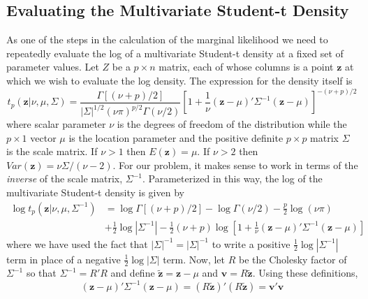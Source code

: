 \documentclass[12pt]{article}
\begin{document}
\subsection{Evaluating the Multivariate Student-t Density}
As one of the steps in the calculation of the marginal likelihood we need to repeatedly evaluate the log of a multivariate Student-t density at a fixed set of parameter values.
Let $Z$ be a $p\times n$ matrix, each of whose columns is a point $\mathbf{z}$ at which we wish to evaluate the log density.
The expression for the density itself is
\begin{equation*}
  t_p\left( \mathbf{z}|\nu,\mu, \Sigma \right) = \frac{\Gamma\left[ (\nu + p)/2 \right]}{|\Sigma|^{1/2}\left( \nu\pi \right)^{p/2}\Gamma\left( \nu/2 \right)}\left[ 1 + \frac{1}{\nu}\left( \mathbf{z} - \mu \right)' \Sigma^{-1} \left( \mathbf{z} - \mu \right)\right]^{-\left( \nu + p \right)/2}
\end{equation*}
where scalar parameter $\nu$ is the degrees of freedom of the distribution while the $p\times 1$ vector $\mu$ is the location parameter and the positive definite $p\times p$ matrix $\Sigma$ is the scale matrix.
If $\nu > 1$ then $E(\mathbf{z}) = \mu$. 
If $\nu >2$ then $Var(\mathbf{z}) = \nu\Sigma/(\nu-2)$.
For our problem, it makes sense to work in terms of the \emph{inverse} of the scale matrix, $\Sigma^{-1}$. 
Parameterized in this way, the log of the multivariate Student-t density is given by
  \begin{align*}
    \log {t_p\left(\mathbf{z}|\nu,\mu, \Sigma^{-1} \right)} &= \log{\Gamma}\left[ \left( \nu + p \right)/2 \right] - \log{\Gamma}\left( \nu/2 \right) - \frac{p}{2}\log{(\nu \pi)}\\
    &+ \frac{1}{2}\log{|\Sigma^{-1}|} - \frac{1}{2}(\nu + p) \log{ \left[ 1 + \frac{1}{\nu}\left(\mathbf{z} - \mu \right)' \Sigma^{-1} \left( \mathbf{z} - \mu \right)\right]}
\end{align*}
where we have used the fact that $|\Sigma|^{-1} = |\Sigma|^{-1}$ to write a positive $\frac{1}{2} \log |\Sigma^{-1}|$ term in place of a negative $\frac{1}{2}\log |\Sigma|$ term.
Now, let $R$ be the Cholesky factor of $\Sigma^{-1}$ so that $\Sigma^{-1} = R'R$ and define $\tilde{\mathbf{z}} = \mathbf{z} - \mu$ and $\mathbf{v} = R\tilde{\mathbf{z}}$.
Using these definitions,
\begin{equation*}
  \left( \mathbf{z} - \mu \right)' \Sigma^{-1} \left( \mathbf{z} - \mu \right) = (R\tilde{\mathbf{z}})'(R\tilde{\mathbf{z}}) = \mathbf{v}' \mathbf{v}
\end{equation*}
\end{document}
